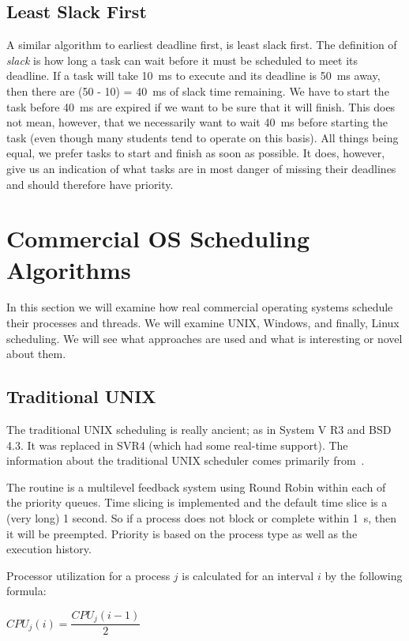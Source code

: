\subsection*{Least Slack First}
A similar algorithm to earliest deadline first, is least slack first. The definition of \textit{slack} is how long a task can wait before it must be scheduled to meet its deadline. If a task will take 10~ms to execute and its deadline is 50~ms away, then there are (50 - 10) = 40~ms of slack time remaining. We have to start the task before 40~ms are expired if we want to be sure that it will finish. This does not mean, however, that we necessarily want to wait 40~ms before starting the task (even though many students tend to operate on this basis). All things being equal, we prefer tasks to start and finish as soon as possible. It does, however, give us an indication of what tasks are in most danger of missing their deadlines and should therefore have priority.


\section*{Commercial OS Scheduling Algorithms}

In this section we will examine how real commercial operating systems schedule their processes and threads. We will examine UNIX, Windows, and finally, Linux scheduling. We will see what approaches are used and what is interesting or novel about them.

\subsection*{Traditional UNIX}

The traditional UNIX scheduling is really ancient; as in System V R3 and BSD 4.3. It was replaced in SVR4 (which had some real-time support). The information about the traditional UNIX scheduler comes primarily from~\cite{osi}.

The routine is a multilevel feedback system using Round Robin within each of the priority queues. Time slicing is implemented and the default time slice is a (very long) 1 second. So if a process does not block or complete within 1~s, then it will be preempted. Priority is based on the process type as well as the execution history.

Processor utilization for a process $j$ is calculated for an interval $i$ by the following formula:

\begin{center}
$CPU_{j}(i) = \dfrac{CPU_{j}(i - 1)}{2}$
\end{center}


